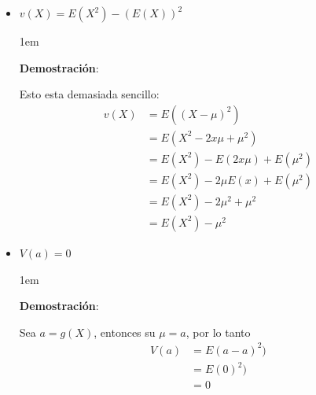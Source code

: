 \documentclass[12pt, fleqn]{report}                             %
\newenvironment{SmallIndentation}[1][0.75em]                    %
        {\begin{adjustwidth}{#1}{}\begin{footnotesize}}             %
        {\end{footnotesize}\end{adjustwidth}}                       %
\theoremstyle{break}                                            %
\begin{document}
                \begin{itemize}

                    \item
                        $v(X) = E(X^2) - (E(X))^2$

                        \begin{SmallIndentation}[1em]
                            \textbf{Demostración}:
                            
                            Esto esta demasiada sencillo:
                            \begin{align*}
                                v(X) 
                                    &= E((X - \mu)^2)                    \\
                                    &= E(X^2 - 2x\mu +\mu^2)             \\
                                    &= E(X^2) - E(2x\mu) + E(\mu^2)      \\
                                    &= E(X^2) - 2\mu E(x) + E(\mu^2)     \\
                                    &= E(X^2) - 2\mu^2 + \mu^2           \\
                                    &= E(X^2) - \mu^2
                            \end{align*}
                        
                        \end{SmallIndentation}
                            

                    \item 
                        $V(a) = 0$

                        \begin{SmallIndentation}[1em]
                            \textbf{Demostración}:
                            
                            Sea $a = g(X)$, entonces su $\mu = a$, por lo
                            tanto
                            \begin{align*}
                                V(a) 
                                    &= E(a - a)^2)           \\
                                    &= E(0)^2)               \\
                                    &= 0
                            \end{align*}
                        

\end{SmallIndentation}
\end{itemize}
\end{document}

